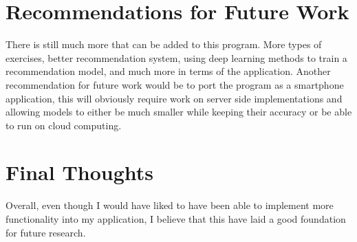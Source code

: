 \section{Recommendations for Future Work}
    There is still much more that can be added to this program. More types of exercises, better recommendation system, using deep learning methods to train a recommendation model, and much more in terms of the application. Another recommendation for future work would be to port the program as a smartphone application, this will obviously require work on server side implementations and allowing models to either be much smaller while keeping their accuracy or be able to run on cloud computing.
\section{Final Thoughts}
    Overall, even though I would have liked to have been able to implement more functionality into my application, I believe that this have laid a good foundation for future research.